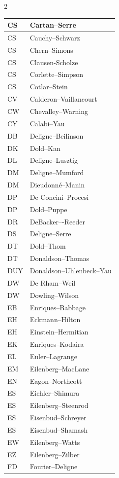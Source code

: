 \documentclass{amsart}
\numberwithin{equation}{section}
\theoremstyle{plain}
\numberwithin{equation}{section}
\theoremstyle{remark}
\begin{document}
\begin{multicols}{2}
{\begin{longtable}{l|l}
CS & Cartan--Serre\\ \hline
CS & Cauchy--Schwarz\\ \hline
CS & Chern--Simons\\ \hline
CS & Clausen-Scholze\\ \hline
CS & Corlette--Simpson\\ \hline
CS & Cotlar--Stein\\ \hline
CV & Calderon--Vaillancourt\\ \hline
CW & Chevalley--Warning\\ \hline
CY & Calabi--Yau\\ \hline
DB & Deligne--Beilinson\\ \hline
DK & Dold--Kan\\ \hline
DL & Deligne--Lusztig\\ \hline
DM & Deligne--Mumford\\ \hline
DM & Dieudonné--Manin\\ \hline
DP & De Concini--Procesi\\ \hline
DP & Dold--Puppe\\ \hline
DR & DeBacker–-Reeder\\ \hline
DS & Deligne--Serre \\ \hline
DT & Dold--Thom\\ \hline
DT & Donaldson--Thomas\\ \hline
DUY & Donaldson--Uhlenbeck--Yau\\ \hline
DW & De Rham--Weil\\ \hline
DW & Dowling--Wilson\\ \hline
EB & Enriques--Babbage\\ \hline
EH & Eckmann--Hilton\\ \hline
EH & Einstein--Hermitian\\ \hline
EK & Enriques--Kodaira\\ \hline
EL & Euler--Lagrange\\ \hline
EM & Eilenberg--MacLane\\ \hline
EN & Eagon--Northcott\\ \hline
ES & Eichler--Shimura\\ \hline
ES & Eilenberg--Steenrod\\ \hline
ES & Eisenbud--Schreyer\\ \hline
ES & Eisenbud--Shamash\\ \hline
EW & Eilenberg--Watts\\ \hline
EZ & Eilenberg--Zilber\\ \hline
FD & Fourier--Deligne\\ \hline

\end{longtable}}
\end{multicols}
\end{document}
